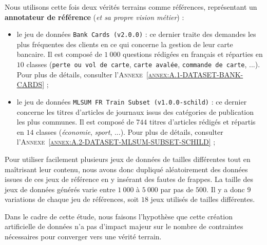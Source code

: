 			Nous utilisons cette fois deux vérités terrains comme références, représentant un \textbf{annotateur de référence} (\textit{et sa propre vision métier}) :
			\begin{itemize}
				\item le jeu de données \texttt{Bank Cards (v2.0.0)} : ce dernier traite des demandes les plus fréquentes des clients en ce qui concerne la gestion de leur carte bancaire.
				Il est composé de $1~000$ questions rédigées en français et réparties en $10$ classes (\texttt{perte ou vol de carte}, \texttt{carte avalée}, \texttt{commande de carte}, ...).
				Pour plus de détails, consulter l'\textsc{Annexe~\ref{annex:A.1-DATASET-BANK-CARDS}} ;
				\item le jeu de données \texttt{MLSUM FR Train Subset (v1.0.0-schild)} : ce dernier concerne les titres d'articles de journaux issus des catégories de publication les plus communes.
				Il est composé de $744$  titres d'articles rédigés et répartis en $14$ classes (\textit{économie}, \textit{sport}, ...).
				Pour plus de détails, consulter l'\textsc{Annexe~\ref{annex:A.2-DATASET-MLSUM-SUBSET-SCHILD}} ;
			\end{itemize}
			
			Pour utiliser facilement plusieurs jeux de données de tailles différentes tout en maîtrisant leur contenu, nous avons donc dupliqué aléatoirement des données issues de ces jeux de référence en y insérant des fautes de frappes.
			La taille des jeux de données générés varie entre $1~000$ à $5~000$ par pas de $500$.
			Il y a donc $9$ variations de chaque jeu de références, soit $18$ jeux utilisés de tailles différentes.
			
			\begin{leftBarWarning}
				Dans le cadre de cette étude, nous faisons l'hypothèse que cette création artificielle de données n'a pas d'impact majeur sur le nombre de contraintes nécessaires pour converger vers une vérité terrain.
			\end{leftBarWarning}
			
